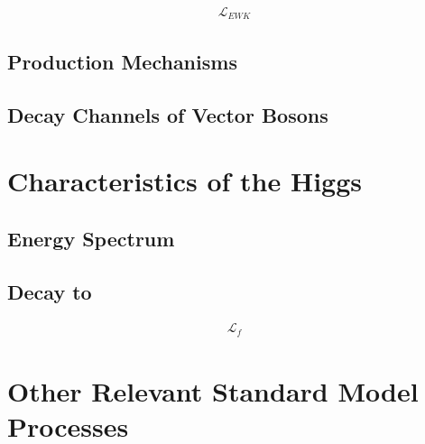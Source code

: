 \begin{gather}
  \mathcal{L}_{EWK}
\end{gather}

\subsection{Production Mechanisms}

\subsection{Decay Channels of Vector Bosons}

\section{Characteristics of the Higgs}

\subsection{Energy Spectrum}

\subsection{Decay to \bb}

\begin{gather}
  \mathcal{L}_{f}
\end{gather}

\section{Other Relevant Standard Model Processes}
